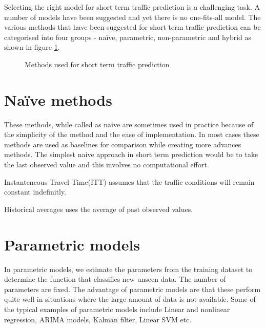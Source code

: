 Selecting the right model for short term traffic prediction is a challenging task. A number of
models have been suggested and yet there is no one-fits-all model. The various methods that have
been suggested for short term traffic prediction can be categorised into four groups -
naïve, parametric, non-parametric and hybrid as shown in figure \ref{fig:taxonomyTrafficPrediction}.


\begin{figure}
\centering
{}
\caption{Methods used for short term traffic prediction} \label{fig:taxonomyTrafficPrediction}
\end{figure}

\section{Naïve methods}
These methods, while called as naive are  sometimes used in practice because of the simplicity
of the method and the ease of implementation. In most cases these methods are used as baselines
for comparison while creating more advances methods. The simplest naive approach in short term
prediction would be to take the last observed value and this involves no computational effort.

Instanteneous Travel Time(ITT) assumes that the traffic conditions will remain constant indefinitly.

Historical averages uses the average of past observed values.

\section{Parametric models}
In parametric models, we estimate the parameters from the training dataset to determine the
function that classifies new unseen data. The number of parameters are fixed. The advantage of
parametric models are that these perform quite well in situations where the large amount of data
is not available. Some of the typical examples of parametric models include Linear and
nonlinear regression, ARIMA models, Kalman filter, Linear SVM etc.


